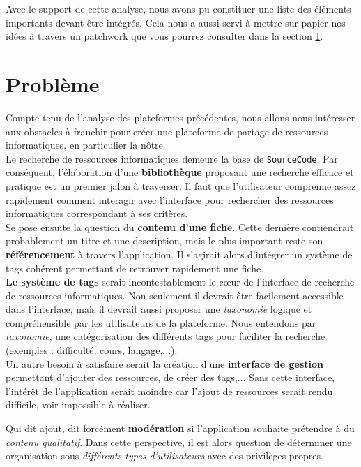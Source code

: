 Avec le support de cette analyse, nous avons pu constituer une liste des éléments importants devant être intégrés. Cela nous a aussi servi à mettre sur papier nos idées à travers un patchwork que vous pourrez consulter dans la section \ref{section:problem}.


\section{Problème}
\label{section:problem}

Compte tenu de l'analyse des plateformes précédentes, nous allons nous intéresser aux obstacles à franchir pour créer une plateforme de partage de ressources informatiques, en particulier la nôtre.\\

Le recherche de ressources informatiques demeure la base de \texttt{SourceCode}. Par conséquent, l'élaboration d'une \textbf{bibliothèque} proposant une recherche efficace et pratique est un premier jalon à traverser. Il faut que l'utilisateur comprenne assez rapidement comment interagir avec l'interface pour rechercher des ressources informatiques correspondant à ses critères.\\

Se pose ensuite la question du \textbf{contenu d'une \gls{fiche}}. Cette dernière contiendrait probablement un titre et une description, mais le plus important reste son \textbf{référencement} à travers l'application. Il s'agirait alors d'intégrer un système de \glspl{tag} cohérent permettant de retrouver rapidement une \gls{fiche}.\\

\textbf{Le système de \glspl{tag}} serait incontestablement le cœur de l'interface de recherche de ressources informatiques. Non seulement il devrait être facilement accessible dans l'interface, mais il devrait aussi proposer une \textit{taxonomie} logique et compréhensible par les utilisateurs de la plateforme. Nous entendons par \textit{taxonomie}, une catégorisation des différents \glspl{tag} pour faciliter la recherche (exemples : difficulté, cours, langage,...).\\

Un autre besoin à satisfaire serait la création d'une \textbf{interface de gestion} permettant d'ajouter des ressources, de créer des \glspl{tag},... Sans cette interface, l'intérêt de l'application serait moindre car l'ajout de ressources serait rendu difficile, voir impossible à réaliser.

Qui dit ajout, dit forcément \textbf{modération} si l'application souhaite prétendre à du \textit{contenu qualitatif}. Dans cette perspective, il est alors question de déterminer une organisation sous \textit{différents types d'utilisateurs} avec des privilèges propres.\\


